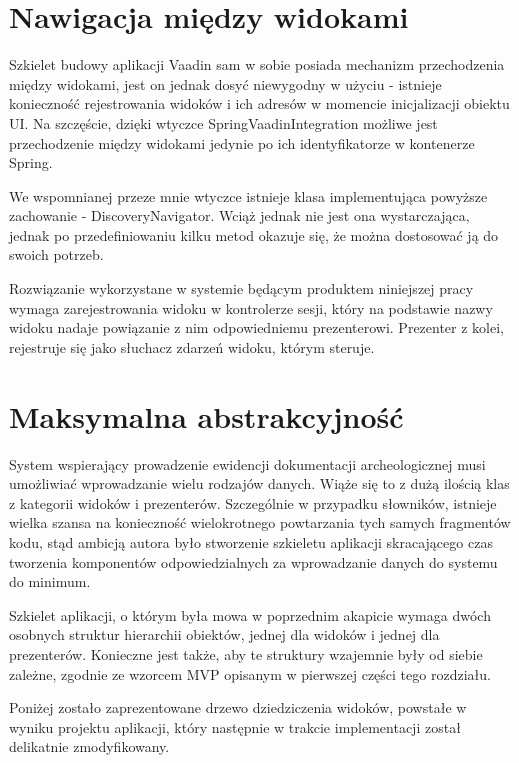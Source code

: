 \newpage
\section{Nawigacja między widokami}
Szkielet budowy aplikacji Vaadin sam w sobie posiada mechanizm przechodzenia między widokami, jest on jednak dosyć niewygodny w użyciu - istnieje konieczność rejestrowania widoków i ich adresów w momencie inicjalizacji obiektu UI. Na szczęście, dzięki wtyczce SpringVaadinIntegration możliwe jest przechodzenie między widokami jedynie po ich identyfikatorze w kontenerze Spring.

We wspomnianej przeze mnie wtyczce istnieje klasa implementująca powyższe zachowanie - DiscoveryNavigator. Wciąż jednak nie jest ona wystarczająca, jednak po przedefiniowaniu kilku metod okazuje się, że można dostosować ją do swoich potrzeb. 

Rozwiązanie wykorzystane w systemie będącym produktem niniejszej pracy wymaga zarejestrowania widoku w kontrolerze sesji, który na podstawie nazwy widoku nadaje powiązanie z nim odpowiedniemu prezenterowi. Prezenter z kolei, rejestruje się jako słuchacz zdarzeń widoku, którym steruje.

\section{Maksymalna abstrakcyjność}
System wspierający prowadzenie ewidencji dokumentacji archeologicznej musi umożliwiać wprowadzanie wielu rodzajów danych. Wiąże się to z dużą ilością klas z kategorii widoków i prezenterów. Szczególnie w przypadku słowników, istnieje wielka szansa na konieczność wielokrotnego powtarzania tych samych fragmentów kodu, stąd ambicją autora było stworzenie szkieletu aplikacji skracającego czas tworzenia komponentów odpowiedzialnych za wprowadzanie danych do systemu do minimum.

Szkielet aplikacji, o którym była mowa w poprzednim akapicie wymaga dwóch osobnych struktur hierarchii obiektów, jednej dla widoków i jednej dla prezenterów. Konieczne jest także, aby te struktury wzajemnie były od siebie zależne, zgodnie ze wzorcem MVP opisanym w pierwszej części tego rozdziału.

Poniżej zostało zaprezentowane drzewo dziedziczenia widoków, powstałe w wyniku projektu aplikacji, który następnie w trakcie implementacji został delikatnie zmodyfikowany. 

